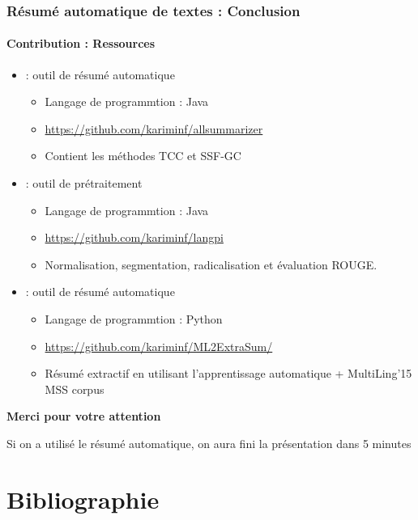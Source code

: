 \documentclass[xcolor=table]{beamer}
\begin{document}
\begin{frame}
\frametitle{Résumé automatique de textes : Conclusion}
\framesubtitle{Contribution : Ressources}
	

\begin{itemize}
	\item {} : outil de résumé automatique
	\begin{itemize}
		\item Langage de programmtion : Java
		\item \url{https://github.com/kariminf/allsummarizer}
		\item Contient les méthodes TCC et SSF-GC
	\end{itemize}
	\item {} : outil de prétraitement
	\begin{itemize}
		\item Langage de programmtion : Java
		\item \url{https://github.com/kariminf/langpi}
		\item Normalisation, segmentation, radicalisation et évaluation ROUGE.
	\end{itemize}
	\item {} : outil de résumé automatique
	\begin{itemize}
		\item Langage de programmtion : Python
		\item \url{https://github.com/kariminf/ML2ExtraSum/}
		\item Résumé extractif en utilisant l'apprentissage automatique + MultiLing’15 MSS corpus
	\end{itemize}
		
\end{itemize}
	
\end{frame}

\begin{frame}[plain]

\begin{center}
	\Huge\bfseries Merci pour votre attention 
\end{center}

\begin{flushright}
	\parbox{.5\textwidth}{%
		Si on a utilisé le résumé automatique, on aura fini la présentation dans 5 minutes
	}%
\end{flushright}

	
\end{frame}

\section*{Bibliographie}
\begin{multicols*}{2}[\frametitle{\insertsection} ]%
\tiny

\end{multicols*}
\end{document}
